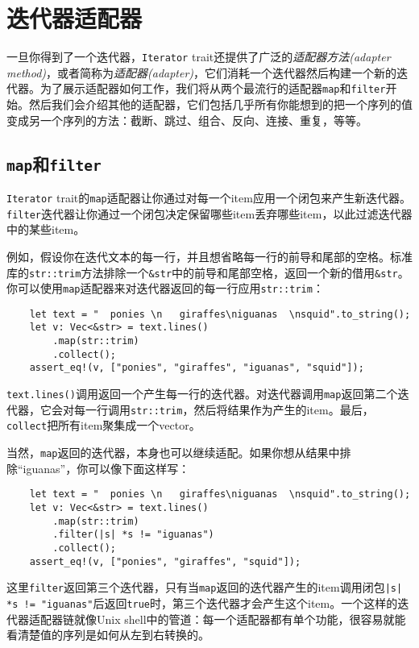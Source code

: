 \section{迭代器适配器}

一旦你得到了一个迭代器，\texttt{Iterator} trait还提供了广泛的\emph{适配器方法(adapter method)}，或者简称为\emph{适配器(adapter)}，它们消耗一个迭代器然后构建一个新的迭代器。为了展示适配器如何工作，我们将从两个最流行的适配器\texttt{map}和\texttt{filter}开始。然后我们会介绍其他的适配器，它们包括几乎所有你能想到的把一个序列的值变成另一个序列的方法：截断、跳过、组合、反向、连接、重复，等等。

\subsection{\texttt{map}和\texttt{filter}}
\texttt{Iterator} trait的\texttt{map}适配器让你通过对每一个item应用一个闭包来产生新迭代器。\texttt{filter}迭代器让你通过一个闭包决定保留哪些item丢弃哪些item，以此过滤迭代器中的某些item。

例如，假设你在迭代文本的每一行，并且想省略每一行的前导和尾部的空格。标准库的\texttt{str::trim}方法排除一个\texttt{\&str}中的前导和尾部空格，返回一个新的借用\texttt{\&str}。你可以使用\texttt{map}适配器来对迭代器返回的每一行应用\texttt{str::trim}：
\begin{verbatim}
    let text = "  ponies \n   giraffes\niguanas  \nsquid".to_string();
    let v: Vec<&str> = text.lines()
        .map(str::trim)
        .collect();
    assert_eq!(v, ["ponies", "giraffes", "iguanas", "squid"]);
\end{verbatim}

\texttt{text.lines()}调用返回一个产生每一行的迭代器。对迭代器调用\texttt{map}返回第二个迭代器，它会对每一行调用\texttt{str::trim}，然后将结果作为产生的item。最后，\texttt{collect}把所有item聚集成一个vector。

当然，\texttt{map}返回的迭代器，本身也可以继续适配。如果你想从结果中排除“iguanas”，你可以像下面这样写：
\begin{verbatim}
    let text = "  ponies \n   giraffes\niguanas  \nsquid".to_string();
    let v: Vec<&str> = text.lines()
        .map(str::trim)
        .filter(|s| *s != "iguanas")
        .collect();
    assert_eq!(v, ["ponies", "giraffes", "squid"]);
\end{verbatim}

这里\texttt{filter}返回第三个迭代器，只有当\texttt{map}返回的迭代器产生的item调用闭包\texttt{|s| *s != "iguanas"}后返回\texttt{true}时，第三个迭代器才会产生这个item。一个这样的迭代器适配器链就像Unix shell中的管道：每一个适配器都有单个功能，很容易就能看清楚值的序列是如何从左到右转换的。

